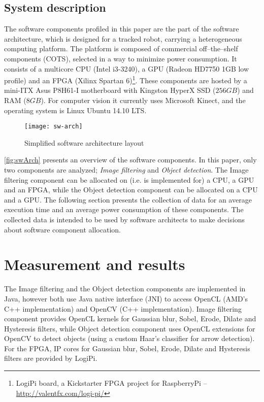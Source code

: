 \documentclass{sig-alternate}
\begin{document}
\subsection{System description}

The software components profiled in this paper are the part of the software architecture, which is designed for a tracked robot, carrying a heterogeneous computing platform. The platform is composed of commercial off--the--shelf components (COTS), selected in a way to minimize power consumption. It consists of a multicore CPU (Intel i3-3240), a GPU (Radeon HD7750 1GB low profile) and an FPGA (Xilinx Spartan 6)\footnote{LogiPi board, a Kickstarter FPGA project for RaspberryPi -- \url{http://valentfx.com/logi-pi/}}. These components are hosted by a mini-ITX Asus P8H61-I motherboard with Kingston HyperX SSD ($256GB$) and RAM ($8GB$). For computer vision it currently uses Microsoft Kinect, and the operating system is Linux Ubuntu 14.10 LTS. 

\begin{figure}[h]
    \centering
		\texttt{[image: sw-arch]}
    \caption{Simplified software architecture layout}
    \label{fig:swArch}
\end{figure}

\noindent \autoref{fig:swArch} presents an overview of the software components. In this paper, only two components are analyzed; \textsl{Image filtering} and \textsl{Object detection}. The Image filtering component can be allocated on  (i.e. is implemented for) a CPU, a GPU and an FPGA, while the Object detection component can be allocated on a CPU and a GPU. 
The following section presents the collection of data for an average execution time and an average power consumption of these components. The collected data is intended to be used by software architects to make decisions about software component allocation.

\section{Measurement and results}

The Image filtering and the Object detection components are implemented in Java, however both use Java native interface (JNI) to access OpenCL (AMD's C++ implementation) and OpenCV (C++ implementation). Image filtering component provides OpenCL kernels for Gaussian blur, Sobel, Erode, Dilate and Hysteresis filters, while Object detection component uses OpenCL extensions for OpenCV to detect objects (using a custom Haar's classifier for arrow detection). For the FPGA, IP cores for Gaussian blur, Sobel, Erode, Dilate and Hysteresis filters are provided by LogiPi.
\end{document}
